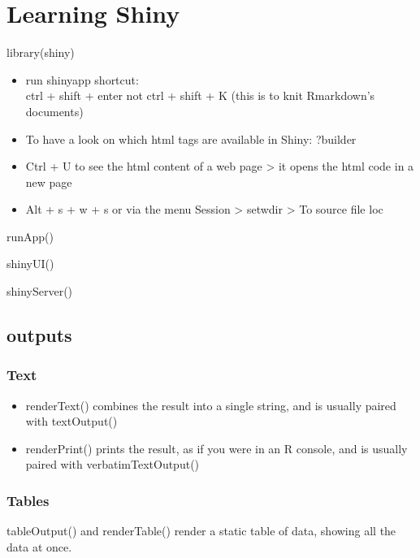 \documentclass[
]{book}
\begin{document}
\hypertarget{learning-shiny}{%
\chapter{Learning Shiny}\label{learning-shiny}}

library(shiny)

\begin{itemize}
\item
  run shinyapp shortcut:\\
  ctrl + shift + enter
  not ctrl + shift + K (this is to knit Rmarkdown's documents)
\item
  To have a look on which html tags are available in Shiny:
  ?builder
\item
  Ctrl + U to see the html content of a web page \textgreater{} it opens the html code in a new page
\item
  Alt + s + w + s
  or via the menu Session \textgreater{} setwdir \textgreater{} To source file loc
\end{itemize}

runApp()

shinyUI()

shinyServer()

\hypertarget{outputs}{%
\section{outputs}\label{outputs}}

\hypertarget{text}{%
\subsection{Text}\label{text}}

\begin{itemize}
\item
  renderText() combines the result into a single string, and is usually paired with textOutput()
\item
  renderPrint() prints the result, as if you were in an R console, and is usually paired with verbatimTextOutput()
\end{itemize}

\hypertarget{tables}{%
\subsection{Tables}\label{tables}}

tableOutput() and renderTable() render a static table of data, showing all the data at once.
\end{document}
